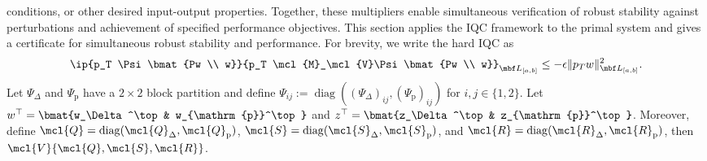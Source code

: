 conditions, or other desired input-output properties.
Together, these multipliers enable simultaneous verification of robust stability
against perturbations and achievement of specified performance objectives.
This section applies the IQC framework to the primal system and gives a
certificate for simultaneous robust stability and performance. For brevity,
we write the hard IQC as
\begin{equation*}
    \ip{p_T \Psi\bmat{Pw \\ w}}{p_T \mcl{M}_\mcl{V}\Psi\bmat{Pw \\ w}}_{\mbf L_{[a, b]}} \leq -\epsilon \|p_T w\|^2_{\mbf L_{[a, b]}}.
\end{equation*}
Let $\Psi_\Delta$ and $\Psi_{\mathrm{p}}$ have a $2\times2$ block partition and define
$\Psi_{ij}:=\operatorname{diag}((\Psi_\Delta)_{ij},(\Psi_{\mathrm{p}})_{ij})$ for
$i,j\in\{1,2\}$. Let $w^\top=\bmat{w_\Delta^\top & w_{\mathrm{p}}^\top}$ and $z^\top=\bmat{z_\Delta^\top & z_{\mathrm{p}}^\top}$.
Moreover, define $\mcl{Q} = \operatorname{diag}(\mcl{Q}_\Delta, \mcl{Q}_{\mathrm{p}})$,
$\mcl{S} = \operatorname{diag}(\mcl{S}_\Delta, \mcl{S}_{\mathrm{p}})$, and
$\mcl{R} = \operatorname{diag}(\mcl{R}_\Delta, \mcl{R}_{\mathrm{p}})$, then
$\mcl{V}\{\mcl{Q}, \mcl{S}, \mcl{R}\}$.

